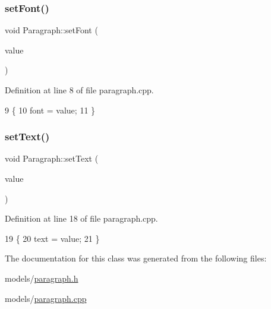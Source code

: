 \subsubsection{\texorpdfstring{set\+Font()}{setFont()}}
{\footnotesize\ttfamily void Paragraph\+::set\+Font (\begin{DoxyParamCaption}\item[{const Q\+Font \&}]{value }\end{DoxyParamCaption})}



Definition at line 8 of file paragraph.\+cpp.


\begin{DoxyCode}
9 \{
10     font = value;
11 \}
\end{DoxyCode}
\mbox{\label{class_paragraph_ae509ab5115df3836870de1cbc78029dd}} 
\subsubsection{\texorpdfstring{set\+Text()}{setText()}}
{\footnotesize\ttfamily void Paragraph\+::set\+Text (\begin{DoxyParamCaption}\item[{const Q\+String \&}]{value }\end{DoxyParamCaption})}



Definition at line 18 of file paragraph.\+cpp.


\begin{DoxyCode}
19 \{
20     text = value;
21 \}
\end{DoxyCode}


The documentation for this class was generated from the following files\+:\begin{DoxyCompactItemize}
\item 
models/\hyperlink{paragraph_8h}{paragraph.\+h}\item 
models/\hyperlink{paragraph_8cpp}{paragraph.\+cpp}\end{DoxyCompactItemize}
